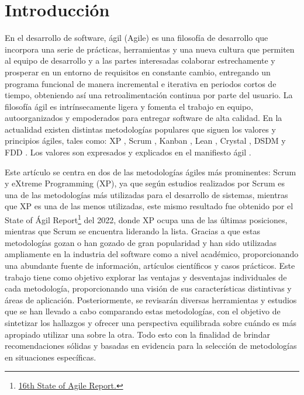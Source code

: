 \documentclass[a4paper,10pt]{article}
\begin{document}
	\section{Introducción}
	En el desarrollo de software, ágil (Agile) es una filosofía de desarrollo que incorpora una serie de prácticas, herramientas y una nueva cultura que permiten al equipo de desarrollo y a las partes interesadas colaborar estrechamente y prosperar en un entorno de requisitos en constante cambio, entregando un programa funcional de manera incremental e iterativa en periodos cortos de tiempo, obteniendo así una retroalimentación continua por parte del usuario. La filosofía ágil es intrínsecamente ligera y fomenta el trabajo en equipo, autoorganizados y empoderados para entregar software de alta calidad. En la actualidad existen distintas metodologías populares que siguen los valores y principios ágiles, tales como: XP \parencite{Beck_Andres_2005}, Scrum \parencite{sutherland2014scrum}, Kanban \parencite{anderson2010kanban}, Lean \parencite{poppendieck2003lean}, Crystal \parencite{cockburn2004crystal}, DSDM \parencite{stapleton1997dynamic} y FDD \parencite{palmer2001practical}. Los valores son expresados y explicados en el manifiesto ágil \parencite{Manifesto_for_Agile_Software_Development}.
	
	Este artículo se centra en dos de las metodologías ágiles más prominentes: Scrum y eXtreme Programming (XP), ya que según estudios realizados por \textcite{fuior2019key} Scrum es una de las metodologías más utilizadas para el desarrollo de sistemas, mientras que XP es una de las menos utilizadas, este mismo resultado fue obtenido por el State of Ágil Report\footnote{\href{https://info.digital.ai/rs/981-LQX-968/images/SOA16.pdf}{16th State of Agile Report.}} del 2022, donde XP ocupa una de las últimas posiciones, mientras que Scrum se encuentra liderando la lista. Gracias a que estas metodologías gozan o han gozado de gran popularidad y han sido utilizadas ampliamente en la industria del software como a nivel académico, proporcionando una abundante fuente de información, artículos científicos y casos prácticos. Este trabajo tiene como objetivo explorar las ventajas y desventajas individuales de cada metodología, proporcionando una visión de sus características distintivas y áreas de aplicación. Posteriormente, se revisarán diversas herramientas y estudios que se han llevado a cabo comparando estas metodologías, con el objetivo de sintetizar los hallazgos y ofrecer una perspectiva equilibrada sobre cuándo es más apropiado utilizar una sobre la otra. Todo esto con la finalidad de brindar recomendaciones sólidas y basadas en evidencia para la selección de metodologías en situaciones específicas.
	
\end{document}
